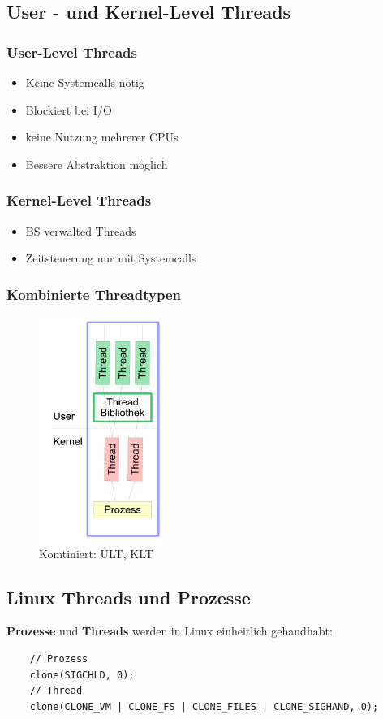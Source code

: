 \subsection{User - und Kernel-Level Threads}

\subsubsection{User-Level Threads}
\begin{itemize}
    \item Keine Systemcalls nötig
    \item Blockiert bei I/O
    \item keine Nutzung mehrerer CPUs
    \item Bessere Abstraktion möglich
\end{itemize}

\subsubsection{Kernel-Level Threads}
\begin{itemize}
    \item BS verwalted Threads
    \item Zeitsteuerung nur mit Systemcalls
\end{itemize}

\subsubsection{Kombinierte Threadtypen}
\begin{figure}[ht!]
    \includegraphics[scale=.8]{pics/ultklt}
    \caption{Komtiniert: ULT, KLT}
\end{figure}

\subsection{Linux Threads und Prozesse}
\textbf{Prozesse} und \textbf{Threads} werden in Linux einheitlich gehandhabt:
\begin{lstlisting}
    // Prozess
    clone(SIGCHLD, 0);
    // Thread
    clone(CLONE_VM | CLONE_FS | CLONE_FILES | CLONE_SIGHAND, 0);
\end{lstlisting}

